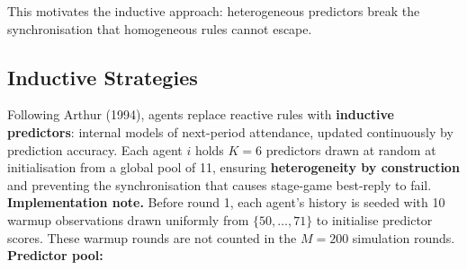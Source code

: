 This motivates the inductive approach: heterogeneous predictors break the synchronisation that homogeneous rules cannot escape. \\

\subsection{Inductive Strategies}

Following Arthur (1994), agents replace reactive rules with \textbf{inductive predictors}: internal models of next-period attendance, updated continuously by prediction accuracy. Each agent $i$ holds $K=6$ predictors drawn at random at initialisation from a global pool of 11, ensuring \textbf{heterogeneity by construction} and preventing the synchronisation that causes stage-game best-reply to fail. \\

\textbf{Implementation note.} Before round 1, each agent's history is seeded with 10 warmup observations drawn uniformly from $\{50, \ldots, 71\}$ to initialise predictor scores. These warmup rounds are not counted in the $M=200$ simulation rounds. \\

\textbf{Predictor pool:} \\

\begin{table}[t]
\centering
\small
{} \\
\caption{Predictor pool for inductive agents (11 total: 7 standard + 2 novel + 3 cyclic variants)}
\end{table}

